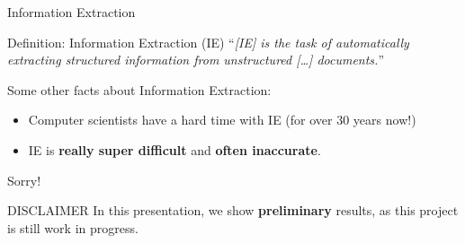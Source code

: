 \documentclass[xcolor=x11names, aspectratio=169,usenames,dvipsnames]{beamer}
\begin{document}
\begin{frame}{Information Extraction}
\begin{block}{Definition: Information Extraction (IE)}\vspace{.5em}
\enquote{\textit{[IE] is the task of automatically extracting structured information from unstructured [\dots] documents.}}
\end{block}\pause\bigskip

\large{Some other facts about Information Extraction:}\normalsize
\begin{itemize}
\item Computer scientists have a hard time with IE (for over \alert{30 years} now!)\pause
\item IE is \textbf{\alert{really super difficult}} and \alert{\textbf{often inaccurate}}.
\end{itemize}
\end{frame}


\begin{frame}{Sorry!}
\begin{large}
\begin{alertblock}{\large DISCLAIMER}\vspace{.5em}
In this presentation, we show \textbf{preliminary} results, as this project is still work in progress.
\end{alertblock}
\end{large}
\end{frame}
\end{document}
